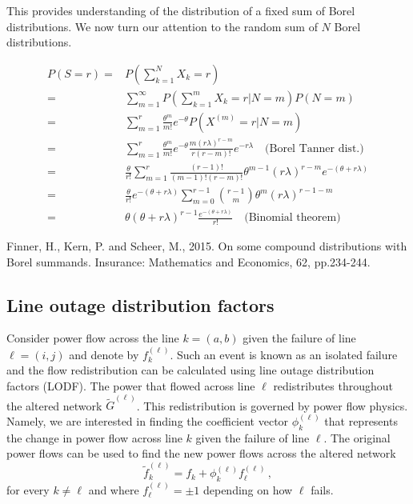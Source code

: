 \documentclass{article}
\begin{document}
This provides understanding of the distribution of a fixed sum of Borel distributions. We now turn our attention to the random sum of $N$ Borel distributions.

\[\begin{aligned}
P(S=r) =& P\left( \sum_{k=1}^{N}  X_k=r \right)\\
=& \sum_{m=1}^{\infty} P\left(\sum_{k=1}^{m} X_k=r|N=m \right)P(N=m)\\
=& \sum_{m=1}^{r} \frac{\theta^m}{m!}e^{-\theta} P(X^{(m)} = r|N=m)\\
=& \sum_{m=1}^{r} \frac{\theta^m}{m!}e^{-\theta} \frac{m(r\lambda)^{r-m}}{r(r-m)!}e^{-r\lambda} \quad \text{(Borel Tanner dist.)}\\
=& \frac{\theta}{r!} \sum_{m=1}^{r} \frac{(r-1)!}{(m-1)!(r-m)!} \theta^{m-1}(r\lambda)^{r-m}e^{-(\theta+r\lambda)}\\
=& \frac{\theta}{r!}e^{-(\theta+r\lambda)} \sum_{m=0}^{r-1} {r-1\choose m} \theta^m (r\lambda)^{r-1-m}\\
=& \theta(\theta + r\lambda)^{r-1} \frac{e^{-(\theta+r\lambda)}}{r!} \quad \text{(Binomial theorem)}
\end{aligned}\]

Finner, H., Kern, P. and Scheer, M., 2015. On some compound distributions with Borel summands. Insurance: Mathematics and Economics, 62, pp.234-244.

\subsection{Line outage distribution factors}
Consider power flow across the line $k=(a,b)$ given the failure of line $\ell=(i,j)$ and denote by $f_k^{(\ell)}$. Such an event is known as an isolated failure and the flow redistribution can be calculated using line outage distribution factors (LODF). The power that flowed across line $\ell$ redistributes throughout the altered network $\tilde G^{(\ell)}$. This redistribution is governed by power flow physics. Namely, we are interested in finding the coefficient vector $\phi_k^{(\ell)}$ that represents the change in power flow across line $k$ given the failure of line $\ell$. The original power flows can be used to find the new power flows across the altered network 
\[\tilde f_k^{(\ell)} = f_k + \phi_k^{(\ell)}f_\ell^{(\ell)}\,,\]
for every $k\ne \ell$ and where $f_\ell^{(\ell)} = \pm 1$ depending on how $\ell$ fails. 
\end{document}
